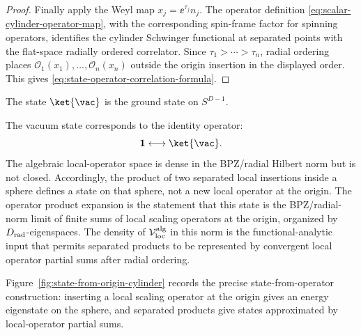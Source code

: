 \begin{proof}
Finally apply the Weyl map \(x_j=\ee^{\tau_j}n_j\).  The operator definition
\eqref{eq:scalar-cylinder-operator-map}, with the corresponding spin-frame
factor for spinning operators, identifies the cylinder Schwinger functional
at separated points with the flat-space radially ordered correlator.  Since
\(\tau_1>\cdots>\tau_n\), radial ordering places
\(\mathcal O_1(x_1),\ldots,\mathcal O_n(x_n)\) outside the origin insertion in
the displayed order.  This gives
\eqref{eq:state-operator-correlation-formula}.

\end{proof}

The state \(\ket{\vac}\) is the ground state on \(S^{D-1}\).

The vacuum state corresponds to the identity operator:
\[
  \mathbf 1\longleftrightarrow\ket{\vac}.
\]
The algebraic local-operator space is dense in the BPZ/radial Hilbert norm but
is not closed.  Accordingly, the product of two separated local insertions
inside a sphere defines a state on that sphere, not a new local operator at
the origin.  The operator product expansion is the statement that this state
is the BPZ/radial-norm limit of finite sums of local scaling operators at the
origin, organized by \(D_{\rm rad}\)-eigenspaces.  The density of
\(\mathcal V_{\rm loc}^{\rm alg}\) in this norm is the functional-analytic
input that permits separated products to be represented by convergent local
operator partial sums after radial ordering.

Figure~\ref{fig:state-from-origin-cylinder} records the precise
state-from-operator construction: inserting a local scaling operator at the
origin gives an energy eigenstate on the sphere, and separated products give
states approximated by local-operator partial sums.

